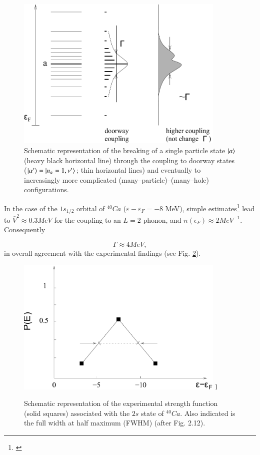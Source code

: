 \begin{figure}
\centerline {
\includegraphics*[width=10cm]{introduccion/figs/figintroD7}
}
\caption{Schematic representation of the breaking of a single particle state $|{a} \rangle$ (heavy black horizontal line) through the coupling to doorway states ($|{\alpha'} \rangle=|{n_\alpha=1,\nu'} \rangle$; thin horizontal lines) and eventually to increasingly more complicated (many--particle)--(many--hole) configurations.}
\label{fig:4.7}
\end{figure}

In the case of the $1s_{1/2}$ orbital of $^{40}Ca$ ($\varepsilon - \varepsilon_F = -8$ MeV), simple estimates\footnote{\cite{Mahaux:85}} lead to $\bar{V}^2 \approx 0.3 MeV$ for the coupling to an $L=2$ phonon, and $n(\epsilon_F) \approx 2MeV^{-1}$. Consequently

\begin{equation}
\Gamma \approx 4 MeV ,
\label{eqn:46}
\end{equation}
in overall agreement with the experimental findings (see Fig. \ref{fig:4.8}).
\begin{figure}[h!]
\centerline {
\includegraphics*[width=10cm]{introduccion/figs/figintroD8}
l}
\caption{Schematic representation of the experimental strength function (solid squares) associated with the $2s$ state of $^{40}Ca$. Also indicated is the full width at half maximum (FWHM) (after \cite{Mahaux:85} Fig. 2.12).}
\label{fig:4.8}
\end{figure}


